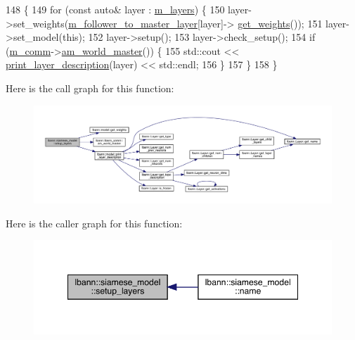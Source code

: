 \begin{DoxyCode}
148                                  \{
149   \textcolor{keywordflow}{for} (\textcolor{keyword}{const} \textcolor{keyword}{auto}& layer : \hyperlink{classlbann_1_1model_a0229fc226ec163d1411548446104569d}{m\_layers}) \{
150     layer->set\_weights(\hyperlink{classlbann_1_1siamese__model_aae7af40b4a2db59082cd4c9149a1affd}{m\_follower\_to\_master\_layer}[layer]->
      \hyperlink{classlbann_1_1model_ac0a89794f1f51e7c502fff2745c973e6}{get\_weights}());
151     layer->set\_model(\textcolor{keyword}{this});
152     layer->setup();
153     layer->check\_setup();
154     \textcolor{keywordflow}{if} (\hyperlink{classlbann_1_1model_a0eabaf2b2f829fd5db3dfd26df420df0}{m\_comm}->\hyperlink{classlbann_1_1lbann__comm_a1ef526486183a29feadca9bef096a534}{am\_world\_master}()) \{
155       std::cout << \hyperlink{classlbann_1_1model_ab173fd93a80a2980059ff292c308cbf5}{print\_layer\_description}(layer) << std::endl;
156     \}
157   \}
158 \}
\end{DoxyCode}
Here is the call graph for this function\+:\nopagebreak
\begin{figure}[H]
\begin{center}
\leavevmode
\includegraphics[width=350pt]{classlbann_1_1siamese__model_afefdbaf473d40e571b2b58539001c9c0_cgraph}
\end{center}
\end{figure}
Here is the caller graph for this function\+:\nopagebreak
\begin{figure}[H]
\begin{center}
\leavevmode
\includegraphics[width=348pt]{classlbann_1_1siamese__model_afefdbaf473d40e571b2b58539001c9c0_icgraph}
\end{center}
\end{figure}


